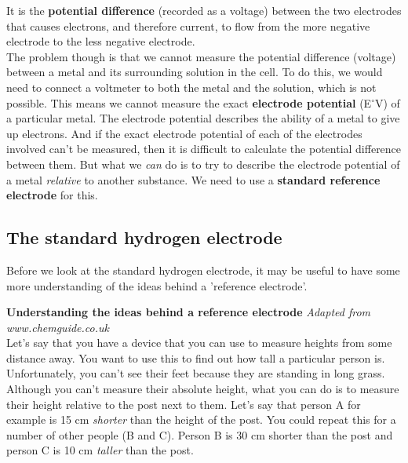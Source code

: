 It is the \textbf{potential difference} (recorded as a voltage) between the two electrodes that causes electrons, and therefore current, to flow from the more negative electrode to the less negative electrode.\\

The problem though is that we cannot measure the potential difference (voltage) between a metal and its surrounding solution in the cell. To do this, we would need to connect a voltmeter to both the metal and the solution, which is not possible. This means we cannot measure the exact \textbf{electrode potential} (E$^{\circ}$V) of a particular metal. The electrode potential describes the ability of a metal to give up electrons. And if the exact electrode potential of each of the electrodes involved can't be measured, then it is difficult to calculate the potential difference between them. But what we \textit{can} do is to try to describe the electrode potential of a metal \textit{relative} to another substance. We need to use a \textbf{standard reference electrode} for this.

\subsection{The standard hydrogen electrode}
\label{subsec:electrochemical:hydrogen electrode}

Before we look at the standard hydrogen electrode, it may be useful to have some more understanding of the ideas behind a 'reference electrode'.

\textbf{Understanding the ideas behind a reference electrode} \textit{Adapted from www.chemguide.co.uk}\\

Let's say that you have a device that you can use to measure heights from some distance away. You want to use this to find out how tall a particular person is. Unfortunately, you can't see their feet because they are standing in long grass. Although you can't measure their absolute height, what you can do is to measure their height relative to the post next to them. Let's say that person A for example is 15 cm \textit{shorter} than the height of the post. You could repeat this for a number of other people (B and C). Person B is 30 cm shorter than the post and person C is 10 cm \textit{taller} than the post.

